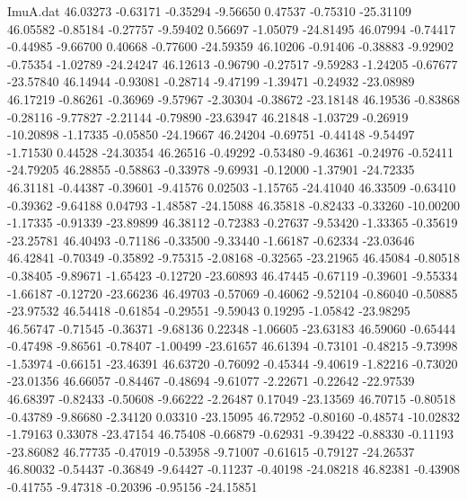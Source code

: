 \begin{filecontents}{ImuA.dat}
  46.03273   -0.63171   -0.35294   -9.56650    0.47537   -0.75310  -25.31109
  46.05582   -0.85184   -0.27757   -9.59402    0.56697   -1.05079  -24.81495
  46.07994   -0.74417   -0.44985   -9.66700    0.40668   -0.77600  -24.59359
  46.10206   -0.91406   -0.38883   -9.92902   -0.75354   -1.02789  -24.24247
  46.12613   -0.96790   -0.27517   -9.59283   -1.24205   -0.67677  -23.57840
  46.14944   -0.93081   -0.28714   -9.47199   -1.39471   -0.24932  -23.08989
  46.17219   -0.86261   -0.36969   -9.57967   -2.30304   -0.38672  -23.18148
  46.19536   -0.83868   -0.28116   -9.77827   -2.21144   -0.79890  -23.63947
  46.21848   -1.03729   -0.26919  -10.20898   -1.17335   -0.05850  -24.19667
  46.24204   -0.69751   -0.44148   -9.54497   -1.71530    0.44528  -24.30354
  46.26516   -0.49292   -0.53480   -9.46361   -0.24976   -0.52411  -24.79205
  46.28855   -0.58863   -0.33978   -9.69931   -0.12000   -1.37901  -24.72335
  46.31181   -0.44387   -0.39601   -9.41576    0.02503   -1.15765  -24.41040
  46.33509   -0.63410   -0.39362   -9.64188    0.04793   -1.48587  -24.15088
  46.35818   -0.82433   -0.33260  -10.00200   -1.17335   -0.91339  -23.89899
  46.38112   -0.72383   -0.27637   -9.53420   -1.33365   -0.35619  -23.25781
  46.40493   -0.71186   -0.33500   -9.33440   -1.66187   -0.62334  -23.03646
  46.42841   -0.70349   -0.35892   -9.75315   -2.08168   -0.32565  -23.21965
  46.45084   -0.80518   -0.38405   -9.89671   -1.65423   -0.12720  -23.60893
  46.47445   -0.67119   -0.39601   -9.55334   -1.66187   -0.12720  -23.66236
  46.49703   -0.57069   -0.46062   -9.52104   -0.86040   -0.50885  -23.97532
  46.54418   -0.61854   -0.29551   -9.59043    0.19295   -1.05842  -23.98295
  46.56747   -0.71545   -0.36371   -9.68136    0.22348   -1.06605  -23.63183
  46.59060   -0.65444   -0.47498   -9.86561   -0.78407   -1.00499  -23.61657
  46.61394   -0.73101   -0.48215   -9.73998   -1.53974   -0.66151  -23.46391
  46.63720   -0.76092   -0.45344   -9.40619   -1.82216   -0.73020  -23.01356
  46.66057   -0.84467   -0.48694   -9.61077   -2.22671   -0.22642  -22.97539
  46.68397   -0.82433   -0.50608   -9.66222   -2.26487    0.17049  -23.13569
  46.70715   -0.80518   -0.43789   -9.86680   -2.34120    0.03310  -23.15095
  46.72952   -0.80160   -0.48574  -10.02832   -1.79163    0.33078  -23.47154
  46.75408   -0.66879   -0.62931   -9.39422   -0.88330   -0.11193  -23.86082
  46.77735   -0.47019   -0.53958   -9.71007   -0.61615   -0.79127  -24.26537
  46.80032   -0.54437   -0.36849   -9.64427   -0.11237   -0.40198  -24.08218
  46.82381   -0.43908   -0.41755   -9.47318   -0.20396   -0.95156  -24.15851

\end{filecontents}
